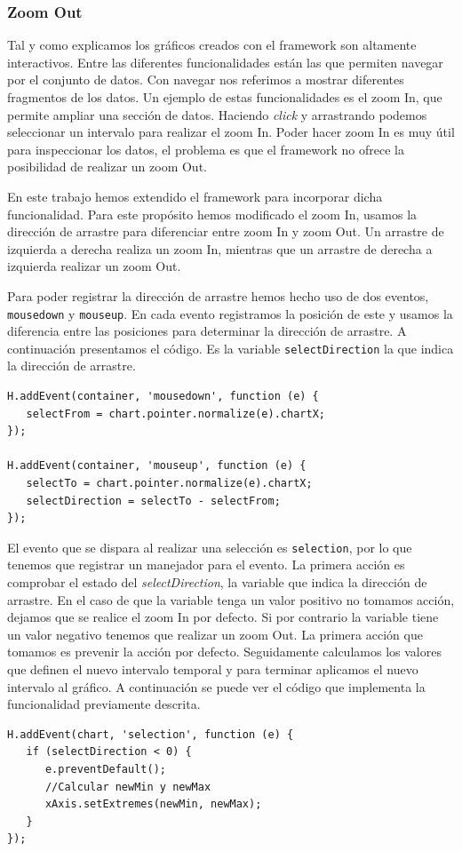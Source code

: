 		\subsubsection{Zoom Out}
			Tal y como explicamos los gráficos creados con el framework son altamente interactivos. Entre las diferentes funcionalidades
			están las que permiten navegar por el conjunto de datos. Con navegar nos referimos a mostrar diferentes fragmentos de los
			datos. Un ejemplo de estas funcionalidades es el zoom In, que permite ampliar una sección de datos. Haciendo \emph{click} y
			arrastrando podemos seleccionar un intervalo para realizar el zoom In. Poder hacer zoom In es muy útil para inspeccionar los
			datos, el problema es que el framework no ofrece la posibilidad de realizar un zoom Out.
			\par
			En este trabajo hemos extendido el framework para incorporar dicha funcionalidad. Para este propósito hemos modificado el zoom
			In, usamos la dirección de arrastre para diferenciar entre zoom In y zoom Out. Un arrastre de izquierda a derecha realiza un
			zoom In, mientras que un arrastre de derecha a izquierda realizar un zoom Out. 
			\par
			Para poder registrar la dirección de arrastre hemos hecho uso de dos eventos, \texttt{mousedown} y \texttt{mouseup}. En cada
			evento registramos la posición de este y usamos la diferencia entre las posiciones para determinar la dirección de arrastre. A
			continuación presentamos el código. Es la variable \texttt{selectDirection} la que indica la dirección de arrastre.
			\begin{lstlisting}[style=myJs]
H.addEvent(container, 'mousedown', function (e) {
   selectFrom = chart.pointer.normalize(e).chartX;
});

H.addEvent(container, 'mouseup', function (e) {
   selectTo = chart.pointer.normalize(e).chartX;
   selectDirection = selectTo - selectFrom;													            
});
			\end{lstlisting}
			\par
			El evento que se dispara al realizar una selección es \texttt{selection}, por lo que tenemos que registrar un manejador para
			el evento. La primera acción es comprobar el estado del \emph{selectDirection}, la variable que indica la dirección de
			arrastre. En el caso de que la variable tenga un valor positivo no tomamos acción, dejamos que se realice el zoom In por
			defecto. Si por contrario la variable tiene un valor negativo tenemos que realizar un zoom Out. La primera acción que tomamos
			es prevenir la acción por defecto. Seguidamente calculamos los valores que definen el nuevo intervalo temporal y para terminar
			aplicamos el nuevo intervalo al gráfico. A continuación se puede ver el código que implementa la funcionalidad previamente
			descrita.
			\begin{lstlisting}[style=myJs]
H.addEvent(chart, 'selection', function (e) {
   if (selectDirection < 0) {
      e.preventDefault();
      //Calcular newMin y newMax
      xAxis.setExtremes(newMin, newMax);
   }
});
			\end{lstlisting}

